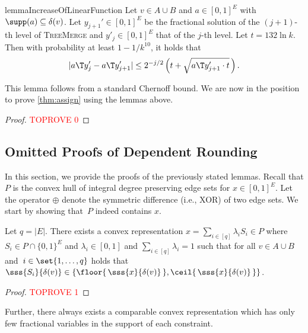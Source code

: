 \documentclass[a4paper,USenglish,cleveref,thm-restate]{lipics-v2021}
\begin{document}
\begin{restatable}{lemma}{IncreaseOfLinearFunction}
    \label{lem:linear-function-increase-per-level}
    Let $v\in A\cup B$ and $a \in [0, 1]^E$ with $\supp(a) \subseteq \delta(v)$.
    Let $y_{j+1}' \in [0,1]^E$
    be the fractional solution of the $(j+1)$-th
    level of \textsc{TreeMerge}
    and $y'_{j}\in [0,1]^E$
    that of the $j$-th level.
    Let $t= 132 \ln k$.
    Then with probability at least $1 - 1/k^{10}$, it holds that
    \begin{equation}
        \label{eq:lfipl-bound-on-lf-increase}
        |a\T y_j' - a\T y_{j+1}'| \le 2^{-j/2} \left(t + \sqrt{a\T y_{j+1}' \cdot t}\,\right).
    \end{equation}
\end{restatable}
This lemma follows from a standard Chernoff bound.
We are now in the position to prove \cref{thm:assign} using the lemmas above.

\begin{proof}\textcolor{red}{TOPROVE 0}\end{proof}

\subsection{Omitted Proofs of Dependent Rounding}
\label{subsec:appendix-ommitted-proofs-of-dependent-rounding}

In this section, we provide the proofs of the previously stated lemmas.
Recall that $P$ is the convex hull of integral degree preserving edge sets for $x\in [0,1]^E$.
Let the operator $\oplus$ denote the symmetric difference (i.e., XOR) of two edge sets.
We start by showing that~$P$ indeed contains $x$.

\begin{lemma}
    \label{lem:convex-hull-of-edge-preserving-edge-sets}
    Let $q = |E|$.
    There exists a convex representation $x = \sum_{i \in [q]} \lambda_i S_i \in P$ where $S_i \in P\cap\{0,1\}^E$ and $\lambda_i \in [0,1]$ and
    $\sum_{i \in [q]} \lambda_i = 1$ such that for all $v\in A\cup B$ and~$i \in \set{1,\dotsc,q}$ holds that $\sss{S_i}{\delta(v)} \in \{\floor{\,\sss{x}{\delta(v)}\,}, \ceil{ \,\sss{x}{\delta(v)} \,}\}$.
\end{lemma}

\begin{proof}\textcolor{red}{TOPROVE 1}\end{proof}

Further, there always exists a comparable convex representation which has only few fractional variables in the support of each constraint.
\end{document}
